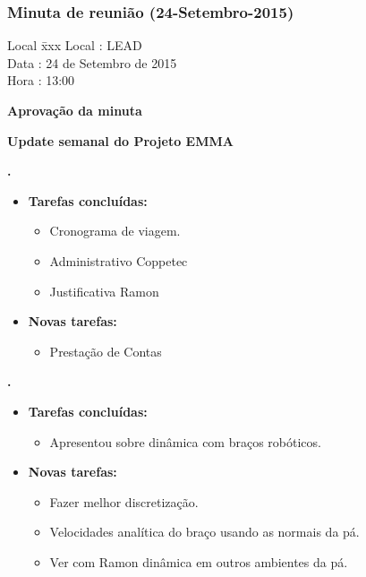 \subsubsection{Minuta de reunião (24-Setembro-2015)}

\begin{tabbing}
  Local \= xxx \kill
  Local \> : LEAD \\
  Data  \> : 24 de Setembro de 2015 \\
  Hora  \> : 13:00
\end{tabbing}


\textbf{Aprovação da minuta}

\textbf{Update semanal do Projeto EMMA}
   							
\textbf{\alana.} 
	\begin{itemize}
		\item \textbf{Tarefas concluídas:}
			\begin{itemize}    
				\item Cronograma de viagem.
				\item Administrativo Coppetec
				\item Justificativa Ramon
				 
			\end{itemize}
		
		\item \textbf{Novas tarefas:}
			\begin{itemize} 
				\item Prestação de Contas
			\end{itemize}
	\end{itemize}   		

	  \textbf{\renan.} 
	\begin{itemize}
		\item \textbf{Tarefas concluídas:}
			\begin{itemize}    
				\item Apresentou sobre dinâmica com braços robóticos.
			\end{itemize}
		
		\item \textbf{Novas tarefas:}
			\begin{itemize} 
			    \item Fazer melhor discretização.
			    \item Velocidades analítica do braço usando as normais da pá.
			    \item Ver com Ramon dinâmica em outros ambientes da pá.
			\end{itemize}
	\end{itemize}	
	 
